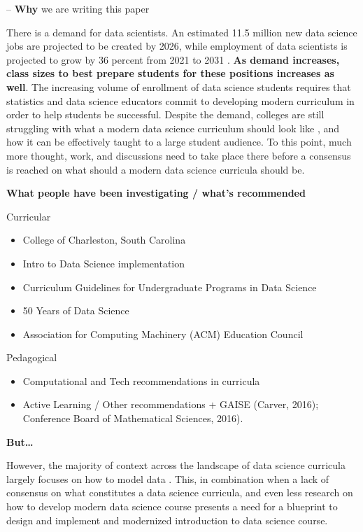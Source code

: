 \documentclass[
  12pt]{article}
\begin{document}
-- \textbf{Why} we are writing this paper

There is a demand for data scientists. An estimated 11.5 million new
data science jobs are projected to be created by 2026, while employment
of data scientists is projected to grow by 36 percent from 2021 to 2031
\citep{labor_2022}. \textbf{As demand increases, class sizes to best
prepare students for these positions increases as well}. The increasing
volume of enrollment of data science students \citep{Redmond2022}
requires that statistics and data science educators commit to developing
modern curriculum in order to help students be successful. Despite the
demand, colleges are still struggling with what a modern data science
curriculum should look like \citep{Schwab2020}, and how it can be
effectively taught to a large student audience. To this point, much more
thought, work, and discussions need to take place there before a
consensus is reached on what should a modern data science curricula
should be.

\textbf{What people have been investigating / what's recommended}

Curricular

\begin{itemize}
\item
  College of Charleston, South Carolina \citep{Anderson2014}
\item
  Intro to Data Science implementation \citep{Asamoah2015}
\item
  Curriculum Guidelines for Undergraduate Programs in Data Science
  \citep{veaux_2017}
\item
  50 Years of Data Science \citep{Donoho_2017}
\item
  Association for Computing Machinery (ACM) Education Council
  \citep{Danyluk_2021}
\end{itemize}

Pedagogical

\begin{itemize}
\item
  Computational and Tech recommendations in curricula
  \citep{Donoho_2017, Beckman_2021}
\item
  Active Learning / Other recommendations
  \citep{Dogucu_2022, CetinkayaRundel_2022} + GAISE (Carver, 2016);
  Conference Board of Mathematical Sciences, 2016).
\end{itemize}

\textbf{But\ldots{}}

However, the majority of context across the landscape of data science
curricula largely focuses on how to model data \citep{Donoho2017}. This,
in combination when a lack of consensus on what constitutes a data
science curricula, and even less research on how to develop modern data
science course presents a need for a blueprint to design and implement
and modernized introduction to data science course.
\end{document}
